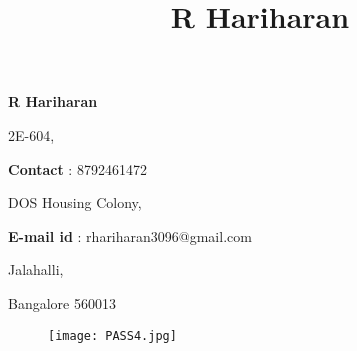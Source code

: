 \documentclass[a4paper,12pt,final]{article}
\title{R Hariharan}
\newcommand\textbox[1]{%
	\parbox{.500\textwidth}{#1}%
}
\begin{document}
	\begin{center}
		\bfseries \LARGE R Hariharan
	\end{center}
	\noindent\makebox[\linewidth]{\rule{\paperwidth}{0.4pt}}
	\noindent\textbox{\small 2E-604,\hfill}\textbox{\hfill \small \textbf{Contact} : 8792461472}
	
	\noindent\textbox{\small DOS Housing Colony,\hfill}\textbox{\hfill \small \textbf{E-mail id} : rhariharan3096@gmail.com}
	
	\noindent\textbox{\small Jalahalli,}

	\noindent\textbox{\small Bangalore 560013}
	
	\begin{figure}[h]
		\noindent\textbox{\hfill}\textbox{\hfill \texttt{[image: PASS4.jpg]}}
	\end{figure}
	
	
\end{document}

